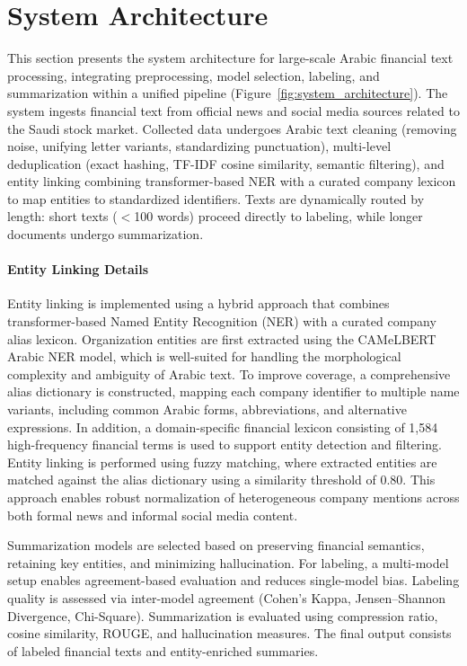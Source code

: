 \documentclass[10pt,a4paper]{article}
\begin{document}


\section{System Architecture}
This section presents the system architecture for large-scale Arabic financial text processing, integrating preprocessing, model selection, labeling, and summarization within a unified pipeline (Figure~\ref{fig:system_architecture}). The system ingests financial text from official news and social media sources related to the Saudi stock market. Collected data undergoes Arabic text cleaning (removing noise, unifying letter variants, standardizing punctuation), multi-level deduplication (exact hashing, TF-IDF cosine similarity, semantic filtering), and entity linking combining transformer-based NER with a curated company lexicon to map entities to standardized identifiers. Texts are dynamically routed by length: short texts ($<$100 words) proceed directly to labeling, while longer documents undergo summarization.

\paragraph{Entity Linking Details}
Entity linking is implemented using a hybrid approach that combines transformer-based Named Entity Recognition (NER) with a curated company alias lexicon. Organization entities are first extracted using the CAMeLBERT Arabic NER model, which is well-suited for handling the morphological complexity and ambiguity of Arabic text. To improve coverage, a comprehensive alias dictionary is constructed, mapping each company identifier to multiple name variants, including common Arabic forms, abbreviations, and alternative expressions. In addition, a domain-specific financial lexicon consisting of 1,584 high-frequency financial terms is used to support entity detection and filtering. Entity linking is performed using fuzzy matching, where extracted entities are matched against the alias dictionary using a similarity threshold of 0.80. This approach enables robust normalization of heterogeneous company mentions across both formal news and informal social media content.

Summarization models are selected based on preserving financial semantics, retaining key entities, and minimizing hallucination. For labeling, a multi-model setup enables agreement-based evaluation and reduces single-model bias. Labeling quality is assessed via inter-model agreement (Cohen's Kappa, Jensen--Shannon Divergence, Chi-Square). Summarization is evaluated using compression ratio, cosine similarity, ROUGE, and hallucination measures. The final output consists of labeled financial texts and entity-enriched summaries.
\end{document}
